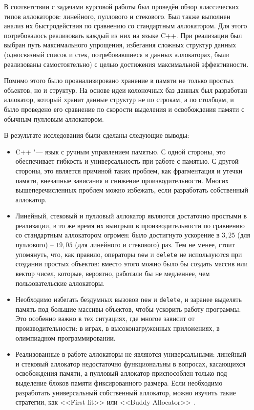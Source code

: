 В соответствии с задачами курсовой работы был проведён обзор классических типов аллокаторов: линейного, пуллового и стекового. Был также выполнен анализ их быстродействия по сравнению со стандартным аллокатором. Для этого потребовалось реализовать каждый из них на языке C++. При реализации был выбран путь максимального упрощения, избегания сложных структур данных (односвязный список и стек, потребовавшиеся в данных аллокаторах, были реализованы самостоятельно) с целью достижения максимальной эффективности.

Помимо этого было проанализировано хранение в памяти не только простых объектов, но и структур. На основе идеи колоночных баз данных был разработан аллокатор, который хранит данные структур не по строкам, а по столбцам, и было проведено его сравнение по скорости выделения и освобождения памяти с обычным пулловым аллокатором.

В результате исследования были сделаны следующие выводы:

\begin{itemize}
\item C++ "--- язык с ручным управлением памятью. С одной стороны, это обеспечивает гибкость и универсальность при работе с памятью. С другой стороны, это является причиной таких проблем, как фрагментация и утечки памяти, внезапные зависания и снижение производительности. Многих вышеперечисленных проблем можно избежать, если разработать собственный аллокатор.
\item Линейный, стековый и пулловый аллокатор являются достаточно простыми в реализации, в то же время их выигрыш в производительности по сравнению со стандартным аллокатором огромен: было достигнуто ускорение в $3,25$ (для пуллового) -- $19,05$ (для линейного и стекового) раз. Тем не менее, стоит упомянуть, что, как правило, операторы \texttt{new} и \texttt{delete} не используются при создании простых объектов: вместо этого можно было бы создать массив или вектор чисел, которые, вероятно, работали бы не медленнее, чем пользовательские аллокаторы.
\item Необходимо избегать бездумных вызовов \texttt{new} и \texttt{delete}, и заранее выделять память под большие массивы объектов, чтобы ускорить работу программы. Это особенно важно в тех ситуациях, где многое зависит от производительности: в играх, в высоконагруженных приложениях, в олимпиадном программировании.
\item Реализованные в работе аллокаторы не являются универсальными: линейный и стековый аллокатор недостаточно функциональны в вопросах, касающихся освобождения памяти, а пулловый аллокатор приспособлен только под выделение блоков памяти фиксированного размера. Если необходимо разработать универсальный собственный аллокатор, можно изучить такие стратегии, как <<First fit>> или <<Buddy Allocator>> \cite{memory-management}.
\end{itemize}

